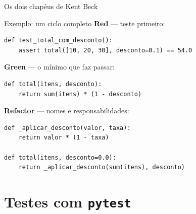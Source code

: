 \documentclass[aspectratio=169]{beamer}
\begin{document}
\begin{frame}{Os dois chapéus de Kent Beck}
  \begin{center}
  \end{center}
\end{frame}

\begin{frame}[fragile]{Exemplo: um ciclo completo}
  \textbf{Red} --- teste primeiro:
\begin{lstlisting}
def test_total_com_desconto():
    assert total([10, 20, 30], desconto=0.1) == 54.0
\end{lstlisting}
  \textbf{Green} --- o mínimo que faz passar:
\begin{lstlisting}
def total(itens, desconto):
    return sum(itens) * (1 - desconto)
\end{lstlisting}
  \textbf{Refactor} --- nomes e responsabilidades:
\begin{lstlisting}
def _aplicar_desconto(valor, taxa):
    return valor * (1 - taxa)

def total(itens, desconto=0.0):
    return _aplicar_desconto(sum(itens), desconto)
\end{lstlisting}
\end{frame}

\section{Testes com \texttt{pytest}}
\end{document}
